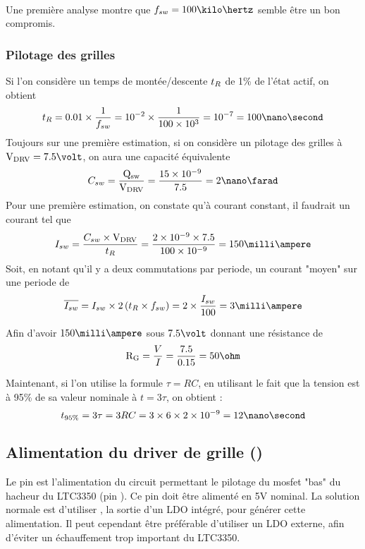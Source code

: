 \paragraph{}
Une première analyse  montre que $\fsw = 100\kilo\hertz$ semble être un bon compromis.

\subsubsection{Pilotage des grilles}
Si l'on considère un temps de montée/descente $\mathnormal{t_{R}}$ de 1\% de l'état actif, on obtient 
$$\trise = 0.01 \times \frac{1}{\fsw} = 10^{-2} \times \frac{1}{100\times10^{3}} = 10^{-7} = 100 \nano\second$$
Toujours sur une première estimation, si on considère un pilotage des grilles à $\vdrv = 7.5\volt$, on aura une capacité équivalente
$$\csw = \frac{\qsw}{\vdrv} = \frac{15\times10^{-9}}{7.5} = 2\nano\farad$$
Pour une première estimation, on constate qu'à courant constant, il faudrait un courant \isw tel que
$$\isw = \frac{\csw \times \vdrv}{\trise} = \frac{2\times 10^{-9} \times 7.5}{100 \times 10^{-9}} = 150 \milli\ampere$$
Soit, en notant qu'il y a deux commutations par periode, un courant "moyen" sur une periode de 
$$\overline{\isw} = \isw \times 2\left(\trise \times \fsw\right) = 2 \times \frac{\isw}{100} = 3\milli\ampere $$

Afin d'avoir $150 \milli\ampere$ sous $7.5 \volt$ donnant une résistance \rgate de 
$$\rgate = \frac{V}{I} = \frac{7.5}{0.15} = 50\ohm$$


Maintenant, si l'on utilise la formule $\tau = RC$, en utilisant le fait que la tension est à 95\% de sa valeur nominale à $t = 3\tau$, on obtient :
$$t_{95\%} = 3\tau = 3RC = 3\times 6 \times 2\times10^{-9} = 12\nano\second $$

\subsection{Alimentation du driver de grille (\drvcc)}
Le pin \drvcc est l'alimentation du circuit permettant le pilotage du mosfet "bas" du hacheur du LTC3350 (pin \bgate).
Ce pin doit être alimenté en 5V nominal. La solution normale est d'utiliser \intvcc, la sortie d'un LDO intégré, pour générer cette alimentation.
Il peut cependant être préférable d'utiliser un LDO externe, afin d'éviter un échauffement trop important du LTC3350.

